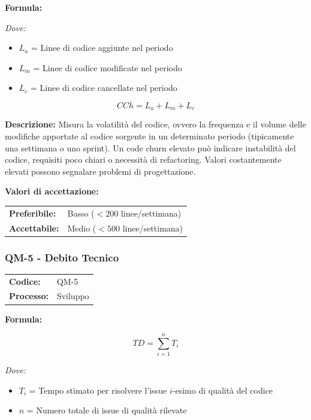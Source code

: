 \documentclass[a4paper,11pt,oneside]{scrartcl}
\begin{document}
\vspace{0.3cm}
\noindent\textbf{Formula:}

\noindent\textit{Dove:}
\begin{itemize}[leftmargin=1.5cm, topsep=0pt, itemsep=0pt]
    \item $L_a$ = Linee di codice aggiunte nel periodo
    \item $L_m$ = Linee di codice modificate nel periodo
    \item $L_c$ = Linee di codice cancellate nel periodo
\end{itemize}

\[
    CCh = L_a + L_m + L_c
\]

\noindent\textbf{Descrizione:} Misura la volatilità del codice, ovvero la frequenza e il volume delle modifiche apportate al codice sorgente in un determinato periodo (tipicamente una settimana o uno sprint). Un code churn elevato può indicare instabilità del codice, requisiti poco chiari o necessità di refactoring{\scriptsize{}}. Valori costantemente elevati possono segnalare problemi di progettazione.

\vspace{0.2cm}
\noindent\textbf{Valori di accettazione:}
\vspace{0.1cm}

\noindent
\begin{tabular}{@{}ll@{}}
    \textbf{Preferibile:} & Basso ($< 200$ linee/settimana) \\
    \textbf{Accettabile:} & Medio ($< 500$ linee/settimana) \\
\end{tabular}

\subsubsection{QM-5 - Debito Tecnico}

\noindent
\begin{tabular}{@{}p{}p{}@{}}
    \textbf{Codice:}   & QM-5     \\
    \textbf{Processo:} & Sviluppo \\
\end{tabular}

\vspace{0.3cm}
\noindent\textbf{Formula:}

\[
    TD = \sum_{i=1}^{n} T_i
\]

\noindent\textit{Dove:}
\begin{itemize}[leftmargin=1.5cm, topsep=0pt, itemsep=0pt]
    \item $T_i$ = Tempo stimato per risolvere l'issue $i$-esimo di qualità del codice
    \item $n$ = Numero totale di issue di qualità rilevate
\end{itemize}
\end{document}
